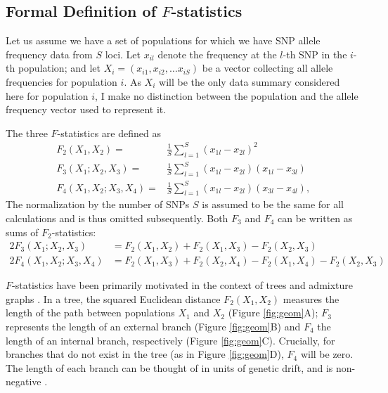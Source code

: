 \documentclass[12pt,fullpage, a4paper]{article}
\begin{document}
\subsection{Formal Definition of $F$-statistics}
Let us assume we have a set of populations for which we have SNP allele frequency data from $S$ loci. Let $x_{il}$ denote the frequency at the $l$-th SNP in the $i$-th population; and let $X_i = (x_{i1}, x_{i2}, \dots x_{iS})$  be a vector collecting all allele frequencies for population $i$. As $X_i$ will be the only data summary considered here for population $i$, I make no distinction between the population and the allele frequency vector used to represent it.

The three $F$-statistics are defined as
\begin{subequations}
	\begin{align}
	F_2(X_1, X_2) =& \frac{1}{S}\sum_{l=1}^S(x_{1l} - x_{2l})^2
	\\
	F_3(X_1; X_2, X_3) =& \frac{1}{S}\sum_{l=1}^S(x_{1l} - x_{2l})(x_{1l} - x_{3l}) \\	
	F_4(X_1, X_2; X_3, X_4) =& \frac{1}{S}\sum_{l=1}^S(x_{1l} - x_{2l})(x_{3l} - x_{4l}) 	\text{,}
	\end{align}
\end{subequations}
The normalization by the number of SNPs $S$ is assumed to be the same for all calculations and is thus omitted subsequently. Both $F_3$ and $F_4$ can be written as sums of $F_2$-statistics:
\begin{subequations}
	\begin{align}
	2F_3(X_1; X_2, X_3) &=  F_2(X_1, X_2) + F_2(X_1, X_3) - F_2(X_2, X_3)\label{eq:f3fromf2}\\
	2F_4(X_1, X_2; X_3, X_4) &= F_2(X_1, X_3) + F_2(X_2, X_4) - F_2(X_1,X_4) - F_2(X_2, X_3)\label{eq:f4fromf2}
	\end{align}
\end{subequations}


$F$-statistics have been primarily motivated in the context of trees and admixture graphs \citep{patterson2012}. In a tree, the squared Euclidean distance $F_2(X_1, X_2)$ measures the length of the path between populations $X_1$ and $X_2$ (Figure \ref{fig:geom}A); $F_3$ represents the length of an external branch (Figure \ref{fig:geom}B) and $F_4$ the length of an internal branch, respectively (Figure \ref{fig:geom}C). Crucially, for branches that do not exist in the tree (as in Figure \ref{fig:geom}D), $F_4$ will be zero. The length of each branch can be thought of in units of genetic drift, and is non-negative \citep{patterson2012}. 
 
\end{document}
